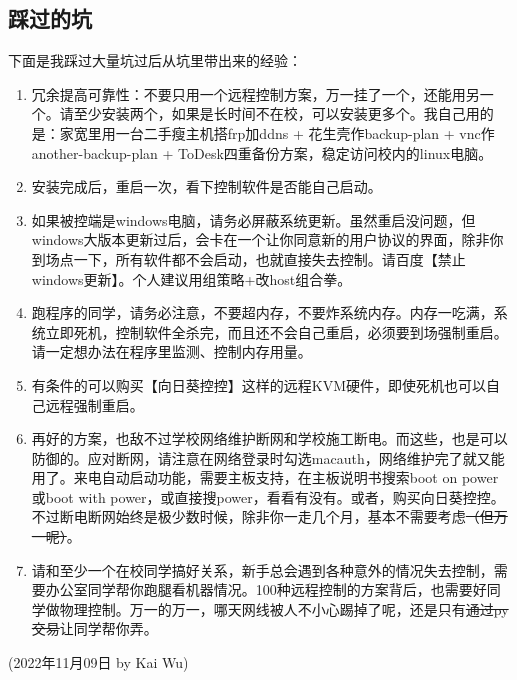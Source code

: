 \subsection{踩过的坑}
下面是我踩过大量坑过后从坑里带出来的经验：
\begin{enumerate}
    \item 冗余提高可靠性：不要只用一个远程控制方案，万一挂了一个，还能用另一个。请至少安装两个，如果是长时间不在校，可以安装更多个。我自己用的是：家宽里用一台二手瘦主机搭frp加ddns + 花生壳作backup-plan + vnc作another-backup-plan + ToDesk四重备份方案，稳定访问校内的linux电脑。
    \item 安装完成后，重启一次，看下控制软件是否能自己启动。
    \item 如果被控端是windows电脑，请务必屏蔽系统更新。虽然重启没问题，但windows大版本更新过后，会卡在一个让你同意新的用户协议的界面，除非你到场点一下，所有软件都不会启动，也就直接失去控制。请百度【禁止windows更新】。个人建议用组策略+改host组合拳。
    \item 跑程序的同学，请务必注意，不要超内存，不要炸系统内存。内存一吃满，系统立即死机，控制软件全杀完，而且还不会自己重启，必须要到场强制重启。请一定想办法在程序里监测、控制内存用量。
    \item 有条件的可以购买【向日葵控控】这样的远程KVM硬件，即使死机也可以自己远程强制重启。
    \item 再好的方案，也敌不过学校网络维护断网和学校施工断电。而这些，也是可以防御的。应对断网，请注意在网络登录时勾选macauth，网络维护完了就又能用了。来电自动启动功能，需要主板支持，在主板说明书搜索boot on power或boot with power，或直接搜power，看看有没有。或者，购买向日葵控控。不过断电断网始终是极少数时候，除非你一走几个月，基本不需要考虑\sout{（但万一呢）}。
    \item 请和至少一个在校同学搞好关系，新手总会遇到各种意外的情况失去控制，需要办公室同学帮你跑腿看机器情况。100种远程控制的方案背后，也需要好同学做物理控制。万一的万一，哪天网线被人不小心踢掉了呢，还是只有\sout{通过py交易}让同学帮你弄。
\end{enumerate}

\begin{flushright}
(2022年11月09日 by Kai Wu)
\end{flushright}





% 
